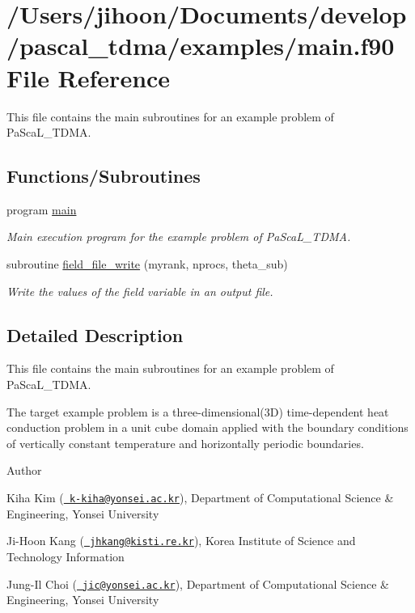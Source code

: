 \hypertarget{main_8f90}{}\section{/\+Users/jihoon/\+Documents/develop/pascal\+\_\+tdma/examples/main.f90 File Reference}
\label{main_8f90}


This file contains the main subroutines for an example problem of Pa\+Sca\+L\+\_\+\+T\+D\+MA.  


\subsection*{Functions/\+Subroutines}
\begin{DoxyCompactItemize}
\item 
program \mbox{\hyperlink{main_8f90_a8ec2266d83cd6c0b762cbcbc92c0af3d}{main}}
\begin{DoxyCompactList}\small\item\em Main execution program for the example problem of Pa\+Sca\+L\+\_\+\+T\+D\+MA. \end{DoxyCompactList}\item 
subroutine \mbox{\hyperlink{main_8f90_af0a1310807f21ee1a2c0fdf14c58b63b}{field\+\_\+file\+\_\+write}} (myrank, nprocs, theta\+\_\+sub)
\begin{DoxyCompactList}\small\item\em Write the values of the field variable in an output file. \end{DoxyCompactList}\end{DoxyCompactItemize}


\subsection{Detailed Description}
This file contains the main subroutines for an example problem of Pa\+Sca\+L\+\_\+\+T\+D\+MA. 

The target example problem is a three-\/dimensional(3D) time-\/dependent heat conduction problem in a unit cube domain applied with the boundary conditions of vertically constant temperature and horizontally periodic boundaries. \begin{DoxyAuthor}{Author}

\end{DoxyAuthor}

\begin{DoxyItemize}
\item Kiha Kim (\href{mailto:k-kiha@yonsei.ac.kr}{\texttt{ k-\/kiha@yonsei.\+ac.\+kr}}), Department of Computational Science \& Engineering, Yonsei University
\item Ji-\/\+Hoon Kang (\href{mailto:jhkang@kisti.re.kr}{\texttt{ jhkang@kisti.\+re.\+kr}}), Korea Institute of Science and Technology Information
\item Jung-\/\+Il Choi (\href{mailto:jic@yonsei.ac.kr}{\texttt{ jic@yonsei.\+ac.\+kr}}), Department of Computational Science \& Engineering, Yonsei University
\end{DoxyItemize}


